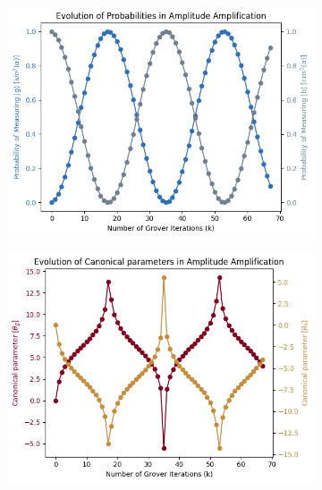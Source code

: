 \documentclass[encoding=utf8,british]{tumphthesis}
\begin{document}
\begin{figure}[H]
            \end{figure}


            \begin{figure}[H]
            \centering

            \begin{subfigure}{0.65\textwidth}
            \includegraphics[width=\linewidth]{pics/can_prob_gb.png}
            \label{subfig:can_PROB_gb}
            \end{subfigure}

            \medskip %
            \begin{subfigure}{0.75\textwidth}
            \includegraphics[width=\linewidth]{pics/can_gb.png}
            {\label{subfig:can_ANG_gb}}
            \end{subfigure}


\end{figure}
\end{document}
